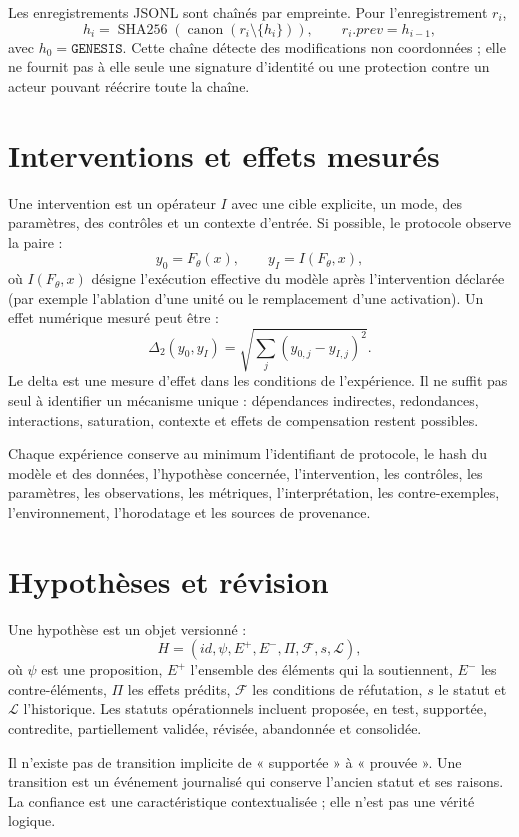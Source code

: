 \documentclass[11pt,a4paper]{article}
\begin{document}
Les enregistrements JSONL sont chaînés par empreinte. Pour l'enregistrement $r_i$,
\[
h_i=\operatorname{SHA256}(\operatorname{canon}(r_i\setminus\{h_i\})),\qquad r_i.prev=h_{i-1},
\]
avec $h_0=\texttt{GENESIS}$. Cette chaîne détecte des modifications non coordonnées ; elle ne fournit pas à elle seule une signature d'identité ou une protection contre un acteur pouvant réécrire toute la chaîne.

\section{Interventions et effets mesurés}
Une intervention est un opérateur $I$ avec une cible explicite, un mode, des paramètres, des contrôles et un contexte d'entrée. Si possible, le protocole observe la paire :
\[
y_0=F_\theta(x),\qquad y_I=I(F_\theta,x),
\]
où $I(F_\theta,x)$ désigne l'exécution effective du modèle après l'intervention déclarée (par exemple l'ablation d'une unité ou le remplacement d'une activation). Un effet numérique mesuré peut être :
\[
\Delta_2(y_0,y_I)=\sqrt{\sum_j(y_{0,j}-y_{I,j})^2}.
\]
Le delta est une mesure d'effet dans les conditions de l'expérience. Il ne suffit pas seul à identifier un mécanisme unique : dépendances indirectes, redondances, interactions, saturation, contexte et effets de compensation restent possibles.

Chaque expérience conserve au minimum l'identifiant de protocole, le hash du modèle et des données, l'hypothèse concernée, l'intervention, les contrôles, les paramètres, les observations, les métriques, l'interprétation, les contre-exemples, l'environnement, l'horodatage et les sources de provenance.

\section{Hypothèses et révision}
Une hypothèse est un objet versionné :
\[
H=(id,\psi,E^+,E^-,\Pi,\mathcal{F},s,\mathcal{L}),
\]
où $\psi$ est une proposition, $E^+$ l'ensemble des éléments qui la soutiennent, $E^-$ les contre-éléments, $\Pi$ les effets prédits, $\mathcal{F}$ les conditions de réfutation, $s$ le statut et $\mathcal{L}$ l'historique. Les statuts opérationnels incluent proposée, en test, supportée, contredite, partiellement validée, révisée, abandonnée et consolidée.

Il n'existe pas de transition implicite de « supportée » à « prouvée ». Une transition est un événement journalisé qui conserve l'ancien statut et ses raisons. La confiance est une caractéristique contextualisée ; elle n'est pas une vérité logique.
\end{document}
